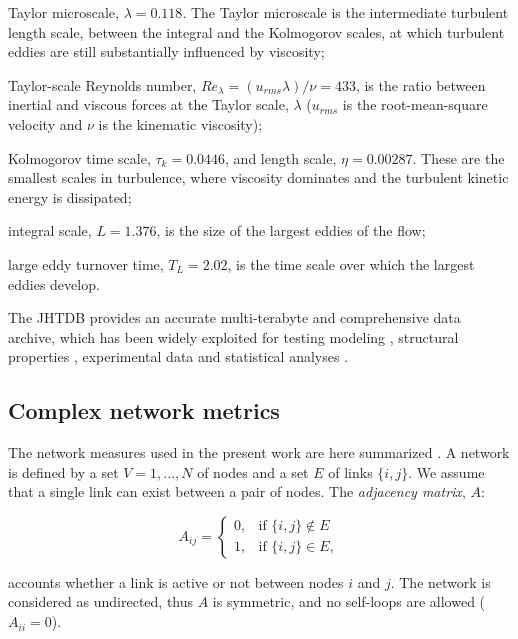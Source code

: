 \documentclass{ws-ijbc}
\begin{document}
\begin{itemlist}
\item Taylor microscale, $\lambda = 0.118$. The Taylor microscale is the intermediate turbulent length scale, between the integral and the Kolmogorov scales, at which turbulent eddies are still substantially influenced by viscosity;
\item Taylor-scale Reynolds number, $Re_{\lambda} = (u_{rms} \lambda)/\nu = 433$, is the ratio between inertial and viscous forces at the Taylor scale, $\lambda$ ($u_{rms}$ is the root-mean-square velocity and $\nu$ is the kinematic viscosity);
\item Kolmogorov time scale, $\tau_k = 0.0446$, and length scale, $\eta = 0.00287$. These are the smallest scales in turbulence, where viscosity dominates and the turbulent kinetic energy is dissipated;
\item integral scale, $L = 1.376$, is the size of the largest eddies of the flow;
\item large eddy turnover time, $T_L=2.02$, is the time scale over which the largest eddies develop.
\end{itemlist}

\noindent The JHTDB provides an accurate multi-terabyte and comprehensive data archive, which has been widely exploited for testing modeling \cite{LES}, structural properties \cite{Lawson}, experimental data \cite{Exper} and statistical analyses \cite{Kolm}.

\subsection{Complex network metrics}

The network measures used in the present work are here summarized \cite{albert_barabasi_2002,Boccaletti2006}. A network is defined by a set $V = {1, ..., N}$ of nodes and a set $E$ of links $\{i,j\}$. We assume that a single link can exist between a pair of nodes. The \emph{adjacency matrix}, $A$:

\begin{equation}
\label{adjacency} A_{ij} = \begin{cases} 0, & \mbox{if } \{i,j\} \notin E\\ 1, & \mbox{if } \{i,j\} \in E, \end{cases}
\end{equation}

\noindent accounts whether a link is active or not between nodes $i$ and $j$. The network is considered as undirected, thus $A$ is symmetric, and no self-loops are allowed ($A_{ii}=0$).
\end{document}
